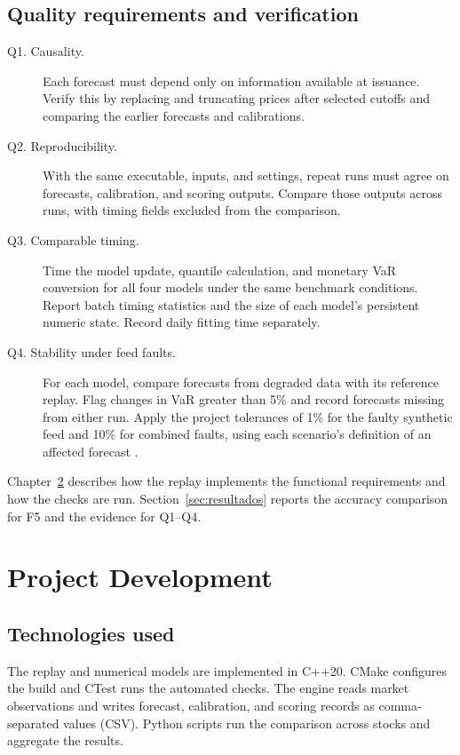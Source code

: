 \documentclass[
	12pt,				%
	openright,			%
	twoside,			%
	a4paper,
	chapter=TITLE,
	english				%
	]{abntex2}
\begin{document}
\section{Quality requirements and verification}

\begin{description}
  \item[Q1. Causality.] Each forecast must depend only on information available at issuance. Verify this by replacing and truncating prices after selected cutoffs and comparing the earlier forecasts and calibrations.
  \item[Q2. Reproducibility.] With the same executable, inputs, and settings, repeat runs must agree on forecasts, calibration, and scoring outputs. Compare those outputs across runs, with timing fields excluded from the comparison.
  \item[Q3. Comparable timing.] Time the model update, quantile calculation, and monetary VaR conversion for all four models under the same benchmark conditions. Report batch timing statistics and the size of each model's persistent numeric state. Record daily fitting time separately.
  \item[Q4. Stability under feed faults.] For each model, compare forecasts from degraded data with its reference replay. Flag changes in VaR greater than 5\% and record forecasts missing from either run. Apply the project tolerances of 1\% for the faulty synthetic feed and 10\% for combined faults, using each scenario's definition of an affected forecast \cite{project-atam}.
\end{description}

Chapter~\ref{cap:desenvolvimento} describes how the replay implements the functional requirements and how the checks are run. Section~\ref{sec:resultados} reports the accuracy comparison for F5 and the evidence for Q1--Q4.

\chapter{Project Development} \label{cap:desenvolvimento}

\section{Technologies used}

The replay and numerical models are implemented in C++20. CMake configures the build and CTest runs the automated checks. The engine reads market observations and writes forecast, calibration, and scoring records as comma-separated values (CSV). Python scripts run the comparison across stocks and aggregate the results.
\end{document}
